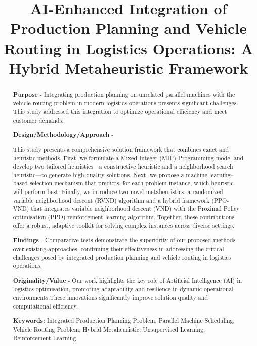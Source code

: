 \documentclass{article}
\begin{document}
\title{AI-Enhanced Integration of Production Planning and Vehicle Routing in Logistics Operations: A Hybrid Metaheuristic Framework}
\maketitle

\begin{abstract}
\textbf{Purpose} - Integrating production planning on unrelated parallel machines with the vehicle routing problem in modern logistics operations presents significant challenges. This study addressed this integration to optimize operational efficiency and meet customer demands.

\textbf{Design/Methodology/Approach} - 

This study presents a comprehensive solution framework that combines exact and heuristic methods. First, we formulate a Mixed Integer (MIP) Programming model and develop two tailored heuristics—a constructive heuristic and a neighborhood search heuristic—to generate high-quality solutions. Next, we propose a machine learning–based selection mechanism that predicts, for each problem instance, which heuristic will perform best. Finally, we introduce two novel metaheuristics: a randomized variable neighborhood descent (RVND) algorithm and a hybrid framework (PPO-VND) that integrates variable neighborhood descent (VND) with the Proximal Policy optimisation (PPO) reinforcement learning algorithm. Together, these contributions offer a robust, adaptive toolkit for solving complex instances across diverse settings.

\textbf{Findings} - Comparative tests demonstrate the superiority of our proposed methods over existing approaches, confirming their effectiveness in addressing the critical challenges posed by integrated production planning and vehicle routing in logistics operations.

\textbf{Originality/Value} - Our work highlights the key role of Artificial Intelligence (AI) in logistics optimisation, promoting adaptability and resilience in dynamic operational environments.These innovations significantly improve solution quality and computational efficiency.

\textbf{Keywords:} Integrated Production Planning Problem; Parallel Machine Scheduling; Vehicle Routing Problem; Hybrid Metaheuristic; Unsupervised Learning; Reinforcement Learning
\end{abstract}
\linenumbers
\end{document}
